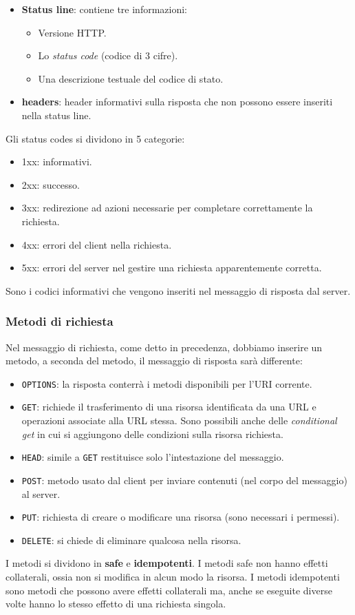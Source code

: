 \begin{itemize}
	\item \textbf{Status line}: contiene tre informazioni:
		\begin{itemize}
			\item Versione HTTP.
			\item Lo \emph{status code} (codice di 3 cifre).
			\item Una descrizione testuale del codice di stato.
		\end{itemize}
	\item \textbf{headers}: header informativi sulla risposta che non possono essere inseriti
		nella status line.
\end{itemize}
Gli status codes si dividono in 5 categorie:
\begin{itemize}
	\item 1xx: informativi.
	\item 2xx: successo.
	\item 3xx: redirezione ad azioni necessarie per completare correttamente la richiesta.
	\item 4xx: errori del client nella richiesta.
	\item 5xx: errori del server nel gestire una richiesta apparentemente corretta.
\end{itemize}
Sono i codici informativi che vengono inseriti nel messaggio di risposta dal server.

\subsubsection{Metodi di richiesta}
Nel messaggio di richiesta, come detto in precedenza, dobbiamo inserire un metodo, a seconda del 
metodo, il messaggio di risposta sarà differente:
\begin{itemize}
	\item \verb|OPTIONS|: la risposta conterrà i metodi disponibili per l'URI corrente.
	\item \verb|GET|: richiede il trasferimento di una risorsa identificata da una URL e operazioni
		associate alla URL stessa. Sono possibili anche delle \emph{conditional get} in cui si
		aggiungono delle condizioni sulla risorsa richiesta.
	\item \verb|HEAD|: simile a \verb|GET| restituisce solo l'intestazione del messaggio.
	\item \verb|POST|: metodo usato dal client per inviare contenuti (nel corpo del messaggio) al
		server.
	\item \verb|PUT|: richiesta di creare o modificare una risorsa (sono necessari i permessi).
	\item \verb|DELETE|: si chiede di eliminare qualcosa nella risorsa.
\end{itemize}
I metodi si dividono in \textbf{safe} e \textbf{idempotenti}. I metodi safe non hanno effetti
collaterali, ossia non si modifica in alcun modo la risorsa. I metodi idempotenti sono metodi che
possono avere effetti collaterali ma, anche se eseguite diverse volte hanno lo stesso effetto di
una richiesta singola.

